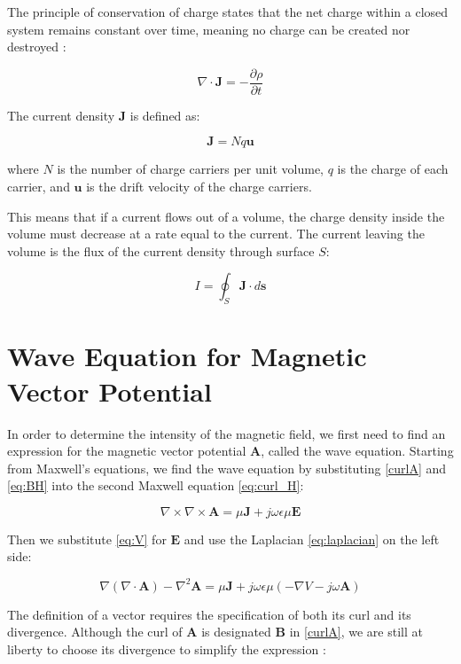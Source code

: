 The principle of conservation of charge states 
that the net charge within a closed system remains 
constant over time, meaning no charge can be 
created nor destroyed \cite{book-magnetism}:

\begin{equation}
    \nabla \cdot \mathbf{J} = -\frac{\partial \rho}
    {\partial t}
\end{equation}

The current density \(\mathbf{J}\) is defined as:

\begin{equation}
    \mathbf{J} = N q \mathbf{u}
\end{equation}

where \(N\) is the number of charge carriers per 
unit volume, \(q\) is the charge of each carrier, 
and \(\mathbf{u}\) is the drift velocity of the 
charge carriers.

This means that if a current flows out of a volume, 
the charge density inside the volume must decrease 
at a rate equal to the current. The current leaving 
the volume is the flux of the current density 
through surface \(S\):

\begin{equation}
    I = \oint_S \mathbf{J} \cdot d\mathbf{s}
    \label{eq:defI}
\end{equation}

\section{Wave Equation for Magnetic Vector Potential}

In order to determine the intensity of the magnetic 
field, we first need to find an expression for the 
magnetic vector potential \(\mathbf{A}\), called the 
wave equation. Starting from Maxwell's equations, 
we find the wave equation by substituting \ref{curlA} 
and \ref{eq:BH} into the second Maxwell equation 
\ref{eq:curl_H}:

\[
    \nabla \times \nabla \times \mathbf{A} = 
    \mu \mathbf{J} + j\omega\epsilon \mu \mathbf{E}
\]

Then we substitute \ref{eq:V} for $\mathbf{E}$ and 
use the Laplacian \ref{eq:laplacian} on the left side:

\[
    \nabla (\nabla \cdot \mathbf{A}) - \nabla^2 
    \mathbf{A} = \mu \mathbf{J} + j\omega \epsilon 
    \mu \left(-\nabla V - j \omega \mathbf{A}\right)
\]

The definition of a vector requires the specification 
of both its curl and its divergence. Although the curl 
of $\mathbf{A}$ is designated $\mathbf{B}$ in 
\ref{curlA}, we are still at liberty to choose its 
divergence to simplify the expression 
\cite{book-magnetism}:

